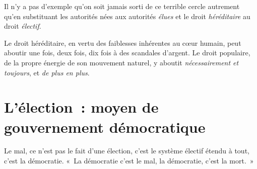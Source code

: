 \documentclass[french,twoside]{book} %
\newcommand{\astermono}{\medskip\centerline{\color{rubric}\large\selectfont{\syms ✻}}\medskip\par}%
\begin{document}
Il n’y a pas d’exemple qu’on soit jamais sorti de ce terrible cercle autrement qu’en substituant les autorités nées aux autorités \emph{élues} et le droit \emph{héréditaire} au droit \emph{électif}.\par
Le droit héréditaire, en vertu des faiblesses inhérentes au cœur humain, peut aboutir une fois, deux fois, dix fois à des scandales d’argent. Le droit populaire, de la propre énergie de son mouvement naturel, y aboutit \emph{nécessairement et toujours}, et \emph{de plus en plus}.
\section[{L’élection : moyen de gouvernement démocratique}]{L’élection : moyen de gouvernement démocratique}
\noindent Le mal, ce n’est pas le fait d’une élection, c’est le système électif étendu à tout, c’est la démocratie. « La démocratie c’est le mal, la démocratie, c’est la mort. »\par

\astermono
\end{document}
